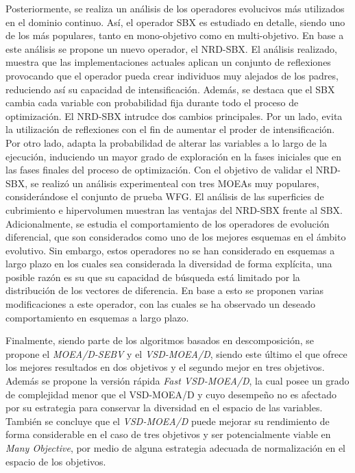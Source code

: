 Posteriormente, se realiza un análisis de los operadores evolucivos más utilizados en el dominio continuo.
%
Así, el operador SBX es estudiado en detalle, siendo uno de los más populares, tanto en mono-objetivo como en multi-objetivo.
%
En base a este análisis se propone un nuevo operador, el NRD-SBX.
%
El análisis realizado, muestra que las implementaciones actuales aplican un conjunto de reflexiones provocando que el operador pueda crear individuos muy alejados de los padres, reduciendo así su capacidad de intensificación.
%
Además, se destaca que el SBX cambia cada variable con probabilidad fija durante todo el proceso de optimización.
%
El NRD-SBX intrudce dos cambios principales.
%
Por un lado, evita la utilización de reflexiones con el fin de aumentar el proder de intensificación.
%
Por otro lado, adapta la probabilidad de alterar las variables a lo largo de la ejecución, induciendo un mayor grado de exploración en la fases iniciales que en las fases finales del proceso de optimización.
%
Con el objetivo de validar el NRD-SBX, se realizó un análisis experimenteal con tres MOEAs muy populares, considerándose el conjunto de prueba WFG.
%
El análisis de las superficies de cubrimiento e hipervolumen muestran las ventajas del NRD-SBX frente al SBX.
%
Adicionalmente, se estudia el comportamiento de los operadores de evolución diferencial, que son considerados como uno de los mejores esquemas en el ámbito evolutivo.
%
Sin embargo, estos operadores no se han considerado en esquemas a largo plazo en los cuales sea considerada la diversidad de forma explícita, una posible razón es su que su capacidad de búsqueda está limitado por la distribución de los vectores de diferencia.
%
En base a esto se proponen varias modificaciones a este operador, con las cuales se ha observado un deseado comportamiento en esquemas a largo plazo.


Finalmente, siendo parte de los algoritmos basados en descomposición, se propone el \textit{MOEA/D-SEBV} y el \textit{VSD-MOEA/D}, siendo este último el que ofrece los mejores resultados en dos objetivos y el segundo mejor en tres objetivos.
%
Además se propone la versión rápida \textit{Fast VSD-MOEA/D}, la cual posee un grado de complejidad menor que el VSD-MOEA/D y cuyo desempeño no es afectado por su estrategia para conservar la diversidad en el espacio de las variables.
%
También se concluye que el \textit{VSD-MOEA/D} puede mejorar su rendimiento de forma considerable en el caso de tres objetivos y ser potencialmente viable en \textit{Many Objective}, por medio de alguna estrategia adecuada de normalización en el espacio de los objetivos.
%

